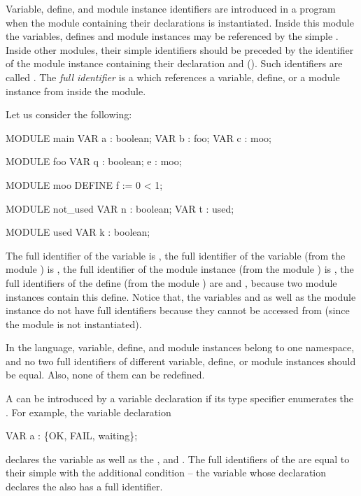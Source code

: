 Variable, define, and module instance identifiers are introduced in a
program when the module containing their declarations is
instantiated.
%
Inside this module the variables, defines and module instances may be
referenced by the simple .
%
Inside other modules, their simple identifiers should be preceded by
the identifier of the module instance containing their declaration and
 ().
%
Such identifiers are called .
%
The \emph{full identifier} is a  which
references a variable, define, or a module instance from inside the
 module.

Let us consider the following:
%
\begin{nusmvCode}
MODULE main
  VAR a : boolean;
  VAR b : foo;
  VAR c : moo;

MODULE foo
  VAR q : boolean;
      e : moo;

MODULE moo
  DEFINE f := 0 < 1;

MODULE not_used
  VAR n : boolean;
  VAR t : used;

MODULE used
  VAR k : boolean;
\end{nusmvCode}
%
The full identifier of the variable  is , the full
identifier of the variable  (from the module ) is
, the full identifier of the module instance  (from
the module ) is , the full identifiers of the
define  (from the module ) are  and
, because two module instances contain this define.
%
Notice that, the variables  and  as well as the module
instance  do not have full identifiers because they cannot be
accessed from  (since the module  is not
instantiated).

In the \nusmv language, variable, define, and module instances belong
to one namespace, and no two full identifiers of different variable,
define, or module instances should be equal. Also, none of them can be
redefined.

A  can be introduced by a variable
declaration if its type specifier enumerates the . For example, the variable declaration
%
\begin{nusmvCode}
  VAR a : \{OK, FAIL, waiting\};
\end{nusmvCode}
%
declares the variable  as well as the  ,  and .
%
The full identifiers of the  are equal to
their simple  with the additional condition --
the variable whose declaration declares the  also has a full identifier.


